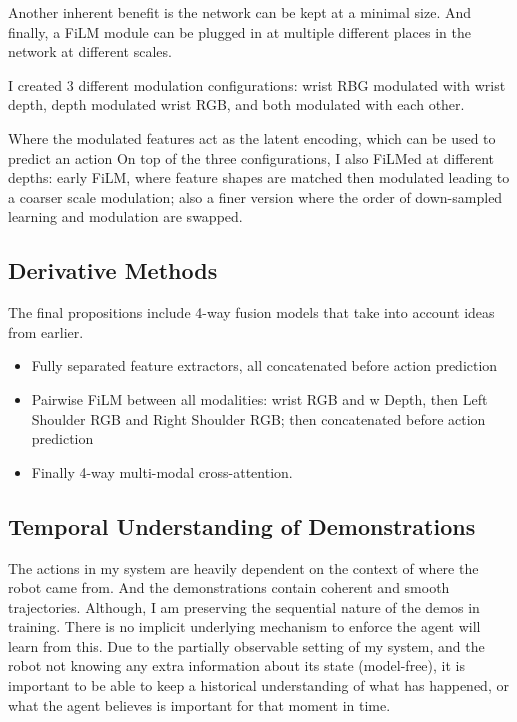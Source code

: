 Another inherent benefit is the network can be kept at a minimal size. And finally, a FiLM module can be plugged in at multiple different places in the network at different scales. 

I created 3 different modulation configurations: wrist RBG modulated with wrist depth, depth modulated wrist RGB, and both modulated with each other. 

Where the modulated features act as the latent encoding, which can be used to predict an action On top of the three configurations, I also FiLMed at different depths: early FiLM, where feature shapes are matched then modulated leading to a coarser scale modulation; also a finer version where the order of down-sampled learning and modulation are swapped.


\subsection{Derivative Methods}
The final propositions include 4-way fusion models that take into account ideas from earlier.
\begin{itemize}
  \item Fully separated feature extractors, all concatenated before action prediction 
  \item Pairwise FiLM between all modalities: wrist RGB and w Depth, then Left Shoulder RGB and Right Shoulder RGB; then concatenated before action prediction
  \item Finally 4-way multi-modal cross-attention. 
\end{itemize}

\subsection{Temporal Understanding of Demonstrations}
The actions in my system are heavily dependent on the context of where the robot came from. And the demonstrations contain coherent and smooth trajectories. Although, I am preserving the sequential nature of the demos in training. There is no implicit underlying mechanism to enforce the agent will learn from this. Due to the partially observable setting of my system, and the robot not knowing any extra information about its state (model-free), it is important to be able to keep a historical understanding of what has happened, or what the agent believes is important for that moment in time.

